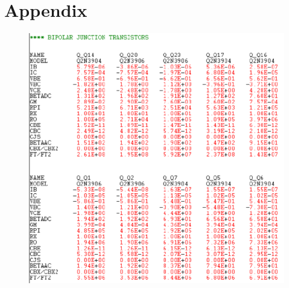 \documentclass{article}
\begin{document}
	\section{Appendix}
	\begin{figure}[!ht]
		\centering
		\includegraphics[width=0.6\textheight]{1.2.png}
		\label{f:7}
	\end{figure}
\end{document}
